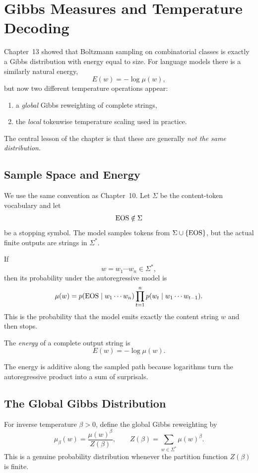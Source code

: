 \chapter{Gibbs Measures and Temperature Decoding}
\label{ch14}

Chapter~13 showed that Boltzmann sampling on combinatorial classes is exactly a Gibbs distribution with energy equal to size. For language models there is a similarly natural energy,
\[
  E(w) = -\log \mu(w),
\]
but now two different temperature operations appear:
\begin{enumerate}
  \item a \emph{global} Gibbs reweighting of complete strings,
  \item the \emph{local} tokenwise temperature scaling used in practice.
\end{enumerate}
The central lesson of the chapter is that these are generally \emph{not the same distribution}.

\section{Sample Space and Energy}

We use the same convention as Chapter~10. Let $\Sigma$ be the content-token vocabulary and let
\[
  \operatorname{EOS} \notin \Sigma
\]
be a stopping symbol. The model samples tokens from $\Sigma \cup \{\operatorname{EOS}\}$, but the actual finite outputs are strings in $\Sigma^*$.

If
\[
  w = w_1\cdots w_n \in \Sigma^*,
\]
then its probability under the autoregressive model is
\[
  \mu(w) = p(\operatorname{EOS} \mid w_1\cdots w_n) \prod_{t=1}^n p(w_t \mid w_1\cdots w_{t-1}).
\]
This is the probability that the model emits exactly the content string $w$ and then stops.

\begin{definition}
The \emph{energy} of a complete output string is
\[
  E(w) = -\log \mu(w).
\]
\end{definition}

The energy is additive along the sampled path because logarithms turn the autoregressive product into a sum of surprisals.

\section{The Global Gibbs Distribution}

For inverse temperature $\beta>0$, define the global Gibbs reweighting by
\[
  \mu_\beta(w) = \frac{\mu(w)^\beta}{Z(\beta)},
  \qquad
  Z(\beta) = \sum_{w \in \Sigma^*} \mu(w)^\beta.
\]
This is a genuine probability distribution whenever the partition function $Z(\beta)$ is finite.

